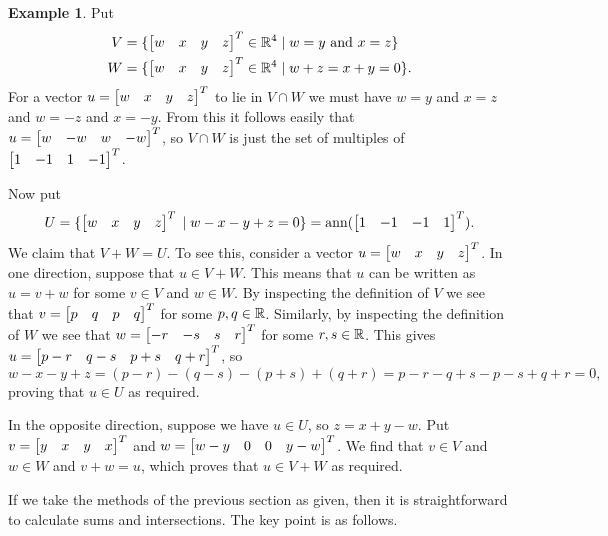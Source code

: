 \documentclass[reqno]{amsart}
\theoremstyle{definition}
\newtheorem{example}[theorem]{Example}
\begin{document}
\begin{example}\label{eg-sum-meet-ii}
 Put
 \begin{align*}
  V &= \{\left[\begin{matrix} w&x&y&z\end{matrix}\right]^T\in{\mathbb{R}}^4\;|\; w=y \text{ and } x=z\} \\
  W &= \{\left[\begin{matrix} w&x&y&z\end{matrix}\right]^T\in{\mathbb{R}}^4\;|\; w+z=x+y=0\}.
 \end{align*}
 For a vector $u=\left[\begin{matrix} w&x&y&z\end{matrix}\right]^T$ to lie in $V\cap W$ we must have
 $w=y$ and $x=z$ and $w=-z$ and $x=-y$.  From this it follows easily
 that $u=\left[\begin{matrix} w&-w&w&-w\end{matrix}\right]^T$, so $V\cap W$ is just the set of
 multiples of $\left[\begin{matrix} 1&-1&1&-1\end{matrix}\right]^T$.

 Now put
 \[ U = \{\left[\begin{matrix} w&x&y&z\end{matrix}\right]^T \;|\; w-x-y+z=0\}
      = \operatorname{ann}(\left[\begin{matrix} 1&-1&-1&1\end{matrix}\right]^T).
 \]
 We claim that $V+W=U$.  To see this, consider a vector
 $u=\left[\begin{matrix} w&x&y&z\end{matrix}\right]^T$.   In one direction, suppose that $u\in V+W$.
 This means that $u$ can be written as $u=v+w$ for some $v\in V$ and
 $w\in W$.  By inspecting the definition of $V$ we see that
 $v=\left[\begin{matrix} p&q&p&q\end{matrix}\right]^T$ for some $p,q\in{\mathbb{R}}$.  Similarly, by inspecting
 the definition of $W$ we see that $w=\left[\begin{matrix} -r&-s&s&r\end{matrix}\right]^T$ for some
 $r,s\in{\mathbb{R}}$.  This gives $u=\left[\begin{matrix} p-r&q-s&p+s&q+r\end{matrix}\right]^T$, so
 \[ w-x-y+z = (p-r)-(q-s)-(p+s)+(q+r)
     =p-r-q+s-p-s+q+r = 0,
 \]
 proving that $u\in U$ as required.

 In the opposite direction, suppose we have $u\in U$, so $z=x+y-w$.
 Put $v=\left[\begin{matrix} y&x&y&x\end{matrix}\right]^T$ and $w=\left[\begin{matrix} w-y&0&0&y-w\end{matrix}\right]^T$.  We find
 that $v\in V$ and $w\in W$ and $v+w=u$, which proves that $u\in V+W$
 as required.
\end{example}

If we take the methods of the previous section as given, then it is
straightforward to calculate sums and intersections.  The key point is
as follows.
\end{document}
